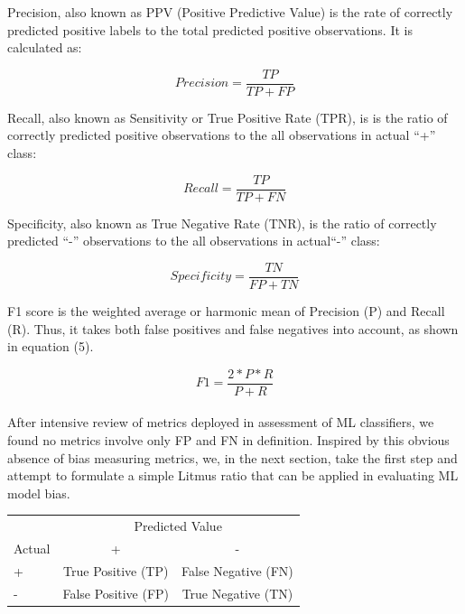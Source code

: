 \documentclass[]{interact}
\theoremstyle{plain}%
\theoremstyle{definition}
\theoremstyle{remark}
\begin{document}
Precision, also known as PPV (Positive Predictive Value) is the rate of correctly predicted positive labels to the total predicted positive observations.  It is calculated as:

\begin{equation}
Precision = \frac {TP}{TP+FP}
\end{equation}

Recall, also known as Sensitivity or True Positive Rate (TPR), is  is the ratio of correctly predicted positive observations to the all observations in actual ``+'' class:

\begin{equation}
Recall = \frac {TP}{TP+FN}
\end{equation} 

Specificity, also known as True Negative Rate (TNR),  is the ratio of correctly predicted ``-'' observations to the all observations in actual``-'' class:

\begin{equation}
Specificity = \frac {TN}{FP+TN}
\end{equation}

F1 score is the weighted average or harmonic mean of Precision (P) and Recall (R). Thus, it takes both false positives and false negatives into account, as shown in equation (5).

\begin{equation}
F1 = \frac {2*P*R}{P + R}
\end{equation}
\\
After intensive review of metrics deployed in assessment of ML classifiers, we found no metrics involve only FP and FN in definition. Inspired by this obvious absence of bias measuring metrics, we, in the next section, take the first step and attempt to  formulate a simple Litmus ratio that can be applied in evaluating ML model bias.


 
\begin{table}
	{\begin{tabular}{lcc} \toprule
			& \multicolumn{2}{c}{Predicted Value} \\ \cmidrule{2-3}
			Actual & + & -  \\ \midrule
			+ & True Positive (TP) & False Negative (FN) \\
   			\midrule
			- & False Positive (FP) &  True Negative (TN) \\
 		
			\bottomrule
	\end{tabular}}
	\label{tab2}
\end{table}
\end{document}
